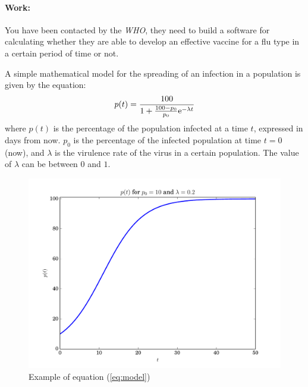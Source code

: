 



\ExamNameLine
{}
\paragraph{Work:}
You have been contacted by the \emph{WHO}, they need to build a
software for calculating whether they are able to develop
an effective 
vaccine for a flu type in a certain period of time or not.

A simple mathematical model for the spreading of an infection in a
population is given by the equation:
\begin{equation}\label{eq:model}
  p(t) = \frac{100}{1+\frac{100-p_0}{p_0}\mathrm{e}^{-\lambda t}}
\end{equation}
where $p(t)$ is the percentage of the population infected
at a time $t$, expressed in days from now. $p_0$ is the percentage of the infected
population at time $t=0$ (now), and $\lambda$ is the virulence rate of
the virus in a certain 
population. The value of $\lambda$ can be between $0$ and $1$.
\begin{figure}[h]
  \begin{center}
    \includegraphics[width=.45\textwidth]{img/logistic.pdf}
    \caption{Example of equation (\ref{eq:model})}
    \label{fig:model}
  \end{center}
\end{figure}

